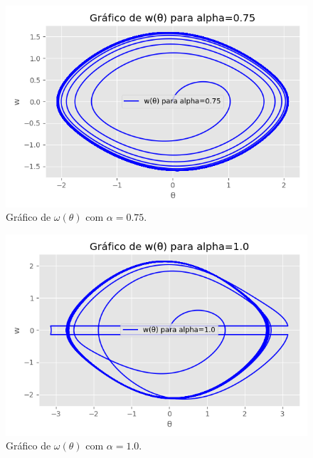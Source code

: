 \documentclass[12pt,a4paper]{article}
\begin{document}
\begin{figure}[H]
\centering
\includegraphics[width=\textwidth]{../tarefa-4b/grafico_w_theta_alpha_0.75.png}
\caption{Gráfico de $\omega(\theta)$ com $\alpha = 0.75$.}
\end{figure}

\begin{figure}[H]
\centering
\includegraphics[width=\textwidth]{../tarefa-4b/grafico_w_theta_alpha_1.0.png}
\caption{Gráfico de $\omega(\theta)$ com $\alpha = 1.0$.}
\end{figure}
\end{document}
